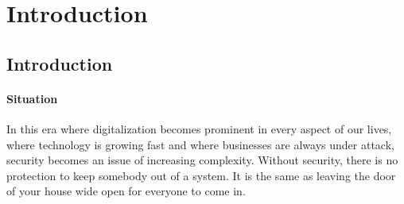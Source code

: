 \chapter{Introduction}
\label{cha:10}
%


\section{Introduction}



\subsubsection{Situation}




In this era where digitalization becomes prominent in every aspect of our lives, where technology is growing fast and where businesses are always under attack, security becomes an issue of increasing complexity. Without security, there is no protection to keep somebody out of a system. It is the same as leaving the door of your house wide open for everyone to come in. \\

